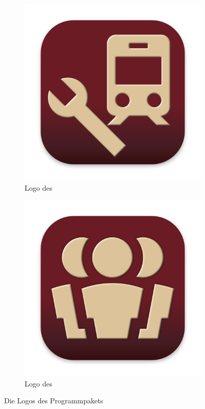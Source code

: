 \begin{figure}[h]
  \begin{subfigure}{0.3\textwidth}
    \includegraphics[width=\textwidth]{../../Icon/Einsatzplaner.png}
    \caption{Logo des \Einsatz}
  \end{subfigure}
  \begin{subfigure}{0.3\textwidth}
    \includegraphics[width=\textwidth]{../../Icon/Personalplaner.png}
    \caption{Logo des \Personal}
  \end{subfigure}
  \caption{Die Logos des Programmpakets}
\end{figure}
%


